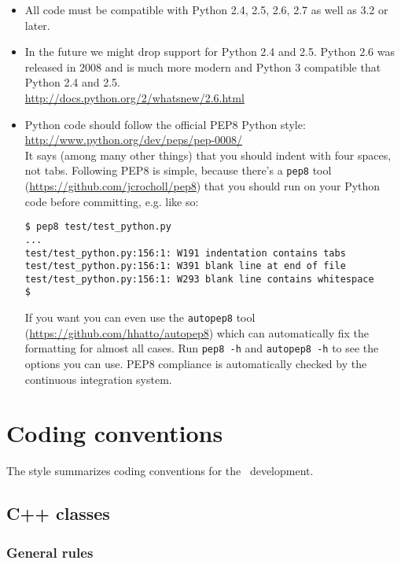 \documentclass{article}[12pt,a4]
\begin{document}
\begin{itemize}
\item All code must be compatible with Python 2.4, 2.5, 2.6, 2.7 as well as 3.2 or later.
\item In the future we might drop support for Python 2.4 and 2.5. Python 2.6 was released in 2008 and
is much more modern and Python 3 compatible that Python 2.4 and 2.5.\\
\url{http://docs.python.org/2/whatsnew/2.6.html}
\item Python code should follow the official PEP8 Python style:\\
\url{http://www.python.org/dev/peps/pep-0008/}\\
It says (among many other things) that you should indent with four spaces, not tabs.
Following PEP8 is simple, because there's a {\tt pep8} tool (\url{https://github.com/jcrocholl/pep8}) that you should
run on your Python code before committing, e.g. like so:
\begin{verbatim}
$ pep8 test/test_python.py
...
test/test_python.py:156:1: W191 indentation contains tabs
test/test_python.py:156:1: W391 blank line at end of file
test/test_python.py:156:1: W293 blank line contains whitespace
$
\end{verbatim}
If you want you can even use the {\tt autopep8} tool (\url{https://github.com/hhatto/autopep8}) which can
automatically fix the formatting for almost all cases. Run {\tt pep8 -h} and {\tt autopep8 -h} to see
the options you can use.
PEP8 compliance is automatically checked by the continuous integration system.
\end{itemize}

\section{Coding conventions}

The style summarizes coding conventions for the \this\ development.

\subsection{C++ classes}

\subsubsection{General rules}
\end{document}
